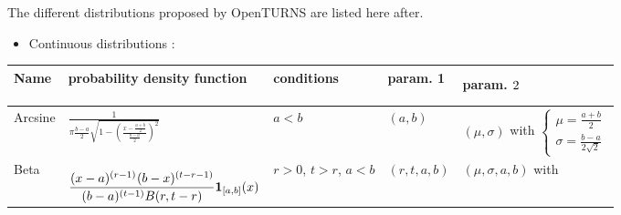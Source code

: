 The different distributions proposed by OpenTURNS are listed here after.\\[1em]

\begin{itemize}
\item Continuous distributions :
\end{itemize}

{\footnotesize

  \noindent \begin{tabular}{|p{1.8cm}|p{6.0cm}|p{2.7cm}|p{1.7cm}|p{4.6cm}|}
    \hline
    Name & probability density function & conditions & param. 1 & param. $2^{\strut}_{\strut}$\\
    \hline
    Arcsine & $\frac{1}{\pi \frac{b-a}{2} \sqrt{1-\left(\frac{x-\frac{a+b}{2}}{\frac{b-a}{2}}\right)^{2}}}$ & $a <b$& $(a, b)$ & $(\mu, \sigma)$ with
    $
    \left\{
      \begin{array}{l}
        \mu = \frac{a+b}{2} \\
        \sigma = \frac{b-a}{2\sqrt{2}}
      \end{array}
    \right.
    $ \\
    \hline
    Beta & $\displaystyle  \frac{(x-a)^{(r-1)^{\strut}}(b-x)^{(t-r-1)}}{(b-a)^{(t-1)}B(r,t-r)}\boldsymbol{1}_{[a,b]}(x)$  & $r>0$, $t>r$, $a < b$ & $(r, t, a, b)$ & $(\mu, \sigma, a,b)$ with


\end{tabular}}
